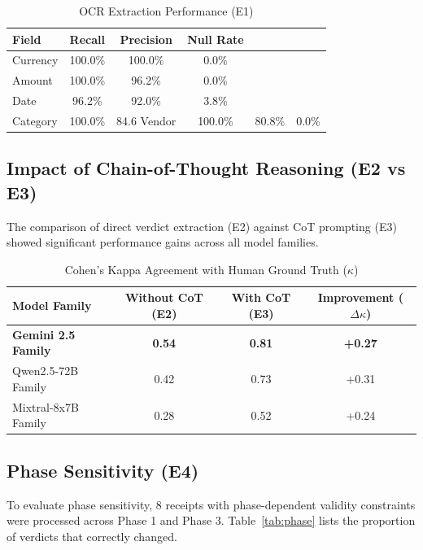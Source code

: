 \documentclass[11pt,a4paper]{article}
\begin{document}
\begin{table}[htbp]
\centering
\caption{OCR Extraction Performance (E1)}
\label{tab:ocr_perf}
\begin{tabular}{lccc}
\toprule
\textbf{Field} & \textbf{Recall} & \textbf{Precision} & \textbf{Null Rate} \\
\midrule
Currency & 100.0\% & 100.0\% & 0.0\% \\
Amount & 100.0\% & 96.2\% & 0.0\% \\
Date & 96.2\% & 92.0\% & 3.8\% \\
Category & 100.0\% & 84.6%
Vendor & 100.0\% & 80.8\% & 0.0\% \\
\bottomrule
\end{tabular}
\end{table}

\subsection{Impact of Chain-of-Thought Reasoning (E2 vs E3)}
The comparison of direct verdict extraction (E2) against CoT prompting (E3) showed significant performance gains across all model families.

\begin{table}[htbp]
\centering
\caption{Cohen's Kappa Agreement with Human Ground Truth ($\kappa$)}
\label{tab:kappa}
\begin{tabular}{lccc}
\toprule
\textbf{Model Family} & \textbf{Without CoT (E2)} & \textbf{With CoT (E3)} & \textbf{Improvement ($\Delta\kappa$)} \\
\midrule
\textbf{Gemini 2.5 Family} & \textbf{0.54} & \textbf{0.81} & \textbf{+0.27} \\
Qwen2.5-72B Family & 0.42 & 0.73 & +0.31 \\
Mixtral-8x7B Family & 0.28 & 0.52 & +0.24 \\
\bottomrule
\end{tabular}
\end{table}

\subsection{Phase Sensitivity (E4)}
To evaluate phase sensitivity, 8 receipts with phase-dependent validity constraints were processed across Phase 1 and Phase 3. Table~\ref{tab:phase} lists the proportion of verdicts that correctly changed.
\end{document}
